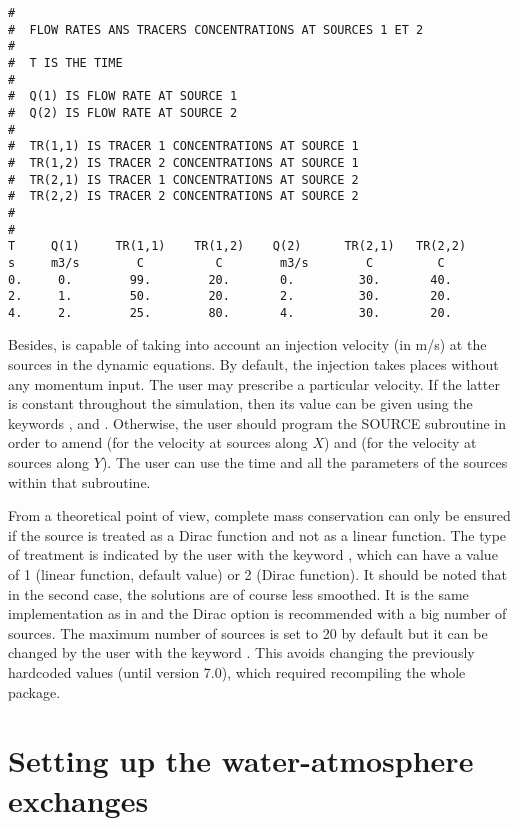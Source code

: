 \begin{lstlisting}[language=TelemacCas]
#
#  FLOW RATES ANS TRACERS CONCENTRATIONS AT SOURCES 1 ET 2
#
#  T IS THE TIME
#
#  Q(1) IS FLOW RATE AT SOURCE 1
#  Q(2) IS FLOW RATE AT SOURCE 2
#
#  TR(1,1) IS TRACER 1 CONCENTRATIONS AT SOURCE 1
#  TR(1,2) IS TRACER 2 CONCENTRATIONS AT SOURCE 1
#  TR(2,1) IS TRACER 1 CONCENTRATIONS AT SOURCE 2
#  TR(2,2) IS TRACER 2 CONCENTRATIONS AT SOURCE 2
#
#
T     Q(1)     TR(1,1)    TR(1,2)    Q(2)      TR(2,1)   TR(2,2)
s     m3/s        C          C        m3/s        C         C
0.     0.        99.        20.       0.         30.       40.
2.     1.        50.        20.       2.         30.       20.
4.     2.        25.        80.       4.         30.       20.
\end{lstlisting}

Besides,  is capable of taking into account an injection velocity (in
m/s) at the sources in the dynamic equations. By default, the injection takes
places without any momentum input. The user may prescribe a particular
velocity. If the latter is constant throughout the simulation, then its value
can be given using the keywords ,
 and
. Otherwise, the user
should program the SOURCE subroutine in order to amend  (for the
velocity at sources along $X$) and  (for the velocity at sources
along $Y$). The user can use the time and all the parameters of the sources
within that subroutine.

From a theoretical point of view, complete mass conservation can only be ensured
if the source is treated as a Dirac function and not as a linear function.
The type of treatment is indicated by the user with the keyword
, which can have a value of 1 (linear function,
default value) or 2 (Dirac function).
It should be noted that in the second case, the solutions are of course
less smoothed.
It is the same implementation as in  and the Dirac option is
recommended with a big number of sources.
The maximum number of sources is set to 20 by default but it can be changed
by the user with the keyword .
This avoids changing the previously hardcoded values (until version 7.0),
which required recompiling the whole package.

\section{Setting up the water-atmosphere exchanges}

